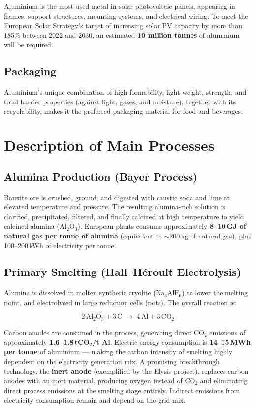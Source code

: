 Aluminium is the most-used metal in solar photovoltaic panels, appearing in frames, support
structures, mounting systems, and electrical wiring. To meet the European Solar Strategy's target
of increasing solar PV capacity by more than 185\% between 2022 and 2030, an estimated
\textbf{10 million tonnes} of aluminium will be required.

\subsection{Packaging}

Aluminium's unique combination of high formability, light weight, strength, and total barrier
properties (against light, gases, and moisture), together with its recyclability, makes it the
preferred packaging material for food and beverages.

\section{Description of Main Processes}

\subsection{Alumina Production (Bayer Process)}

Bauxite ore is crushed, ground, and digested with caustic soda and lime at elevated temperature and
pressure. The resulting alumina-rich solution is clarified, precipitated, filtered, and finally
calcined at high temperature to yield calcined alumina ($\text{Al}_2\text{O}_3$). European plants
consume approximately \textbf{8--10\,GJ of natural gas per tonne of alumina} (equivalent to
$\sim$200\,kg of natural gas), plus 100--200\,kWh of electricity per tonne.

\subsection{Primary Smelting (Hall–Héroult Electrolysis)}

Alumina is dissolved in molten synthetic cryolite ($\text{Na}_3\text{AlF}_6$) to lower the melting
point, and electrolysed in large reduction cells (pots). The overall reaction is:

\[
2\,\text{Al}_2\text{O}_3 + 3\,\text{C} \;\longrightarrow\; 4\,\text{Al} + 3\,\text{CO}_2
\]

Carbon anodes are consumed in the process, generating direct CO$_2$ emissions of approximately
\textbf{1.6--1.8\,tCO$_2$/t Al}. Electric energy consumption is \textbf{14--15\,MWh per tonne}
of aluminium — making the carbon intensity of smelting highly dependent on the electricity
generation mix. A promising breakthrough technology, the \textbf{inert anode} (exemplified by the
Elysis project), replaces carbon anodes with an inert material, producing oxygen instead of CO$_2$
and eliminating direct process emissions at the smelting stage entirely. Indirect emissions from
electricity consumption remain and depend on the grid mix.

